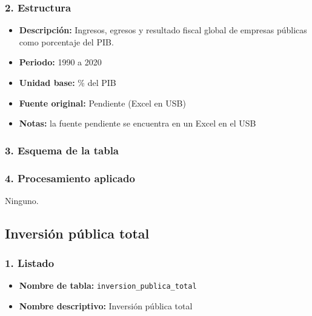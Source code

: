 \documentclass[12pt,a4paper]{article}
\begin{document}
\subsubsection*{2. Estructura}
\begin{itemize}
  \item \textbf{Descripción:} Ingresos, egresos y resultado fiscal global de empresas públicas como porcentaje del PIB.
  \item \textbf{Periodo:} 1990 a 2020
  \item \textbf{Unidad base:} \% del PIB
  \item \textbf{Fuente original:} Pendiente (Excel en USB)
  \item \textbf{Notas:} la fuente pendiente se encuentra en un Excel en el USB
\end{itemize}

\subsubsection*{3. Esquema de la tabla}

\subsubsection*{4. Procesamiento aplicado}
Ninguno.

\subsection{Inversión pública total}

\subsubsection*{1. Listado}
\begin{itemize}
  \item \textbf{Nombre de tabla:} \texttt{inversion\_publica\_total}
  \item \textbf{Nombre descriptivo:} Inversión pública total
\end{itemize}
\end{document}
